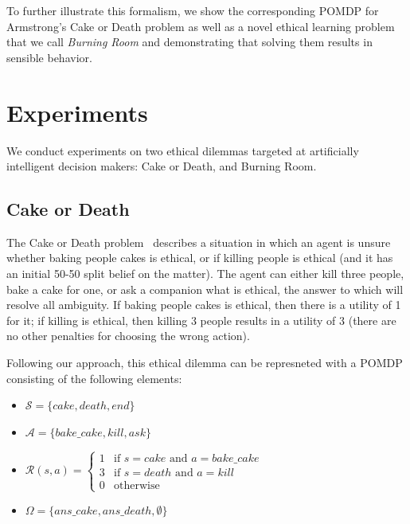 \documentclass[11pt]{article}
\begin{document}
To further illustrate this formalism, we show the corresponding POMDP for Armstrong's Cake or Death problem as well as a novel ethical learning problem that we call {\em Burning Room} and demonstrating that solving them results in sensible behavior.






\section{Experiments}

We conduct experiments on two ethical dilemmas targeted at artificially intelligent decision makers: Cake or Death, and Burning Room.

\subsection{Cake or Death}
The Cake or Death problem~\cite{AAAIW1510183} describes a situation in which an agent is unsure whether baking people cakes is ethical, or if killing people is ethical (and it has an initial 50-50 split belief on the matter). The agent can either kill three people, bake a cake for one, or ask a companion what is ethical, the answer to which will resolve all ambiguity. If baking people cakes is ethical, then there is a utility of 1 for it; if killing is ethical, then killing 3 people results in a utility of 3 (there are no other penalties for choosing the wrong action).

Following our approach, this ethical dilemma can be represneted with a POMDP consisting of the following elements:
\begin{itemize}
\item[] $\mathcal{S} = \{ cake, death, end \}$
\item[] $\mathcal{A} = \{bake\_cake, kill, ask \}$
\item[] $\mathcal{R}(s, a) =
 \begin{cases} 
1 & \mbox{if } s = cake \mbox{ and } a = bake\_cake \\
3 & \mbox{if } s = death \mbox{ and } a = kill \\
0 & \mbox{otherwise}
\end{cases}$
\item[] $\Omega = \{ans\_cake, ans\_death, \emptyset \}$
\end{itemize}
\end{document}
